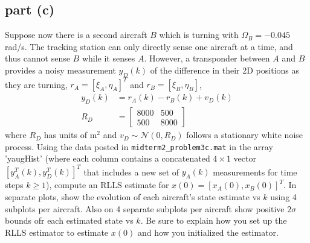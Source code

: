 \documentclass[11pt]{article}
\begin{document}
\subsection*{part (c)}
Suppose now there is a second aircraft $B$ which is turning with $\Omega_B=-0.045$ rad/s. The tracking station can only directly sense one aircraft at a time, and thus cannot sense $B$ while it senses $A$. However, a transponder between $A$ and $B$ provides a noisy measurement $y_D(k)$ of the difference in their 2D positions as they are turning, $r_A=[\xi_A,\eta_A]^T$ and $r_B=[\xi_B,\eta_B]$,
\begin{align*}
	y_D(k)&=r_A(k)-r_B(k)+v_D(k) \\
	R_D &= \begin{bmatrix} 8000 & 500 \\ 500 & 8000 \end{bmatrix}
\end{align*}
where $R_D$ has units of $\text{m}^2$ and $v_D\sim\mathcal{N}(0,R_D)$ follows a stationary white noise process. Using the data posted in \texttt{midterm2\_problem3c.mat} in the array 'yaugHist' (where each column contains a concatenated $4\times1$ vector $[y_A^T(k),y_D^T(k)]^T$ that includes a new set of $y_A(k)$ measurements for time steps $k\geq1$), compute an RLLS estimate for $x(0)=[x_A(0),x_B(0)]^T$. In separate plots, show the evolution of each aircraft's state estimate vs $k$ using 4 subplots per aircraft. Also on 4 separate subplots per aircraft show positive $2\sigma$ bounds ofr each estimated state vs $k$. Be sure to explain how you set up the RLLS estimator to estimate $x(0)$ and how you initialized the estimator.
\end{document}

